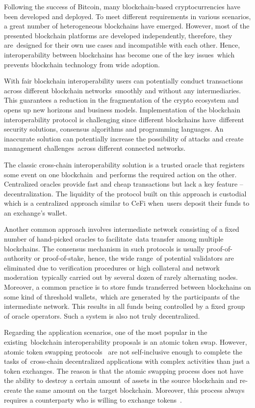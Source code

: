 Following the success of Bitcoin, many blockchain-based cryptocurrencies have been developed and deployed.
To meet different requirements in various scenarios, a great number of heterogeneous blockchains have emerged.
However, most of the presented blockchain platforms are developed independently, therefore, they are\
designed for their own use cases and incompatible with each other.
Hence, interoperability between blockchains has become one of the key issues\
which prevents blockchain technology from wide adoption.

With fair blockchain interoperability users can potentially conduct transactions across different blockchain networks\
smoothly and without any intermediaries.
This guarantees a reduction in the fragmentation of the crypto ecosystem and opens up new horizons and business models.
Implementation of the blockchain interoperability protocol is challenging since different blockchains have\
different security solutions, consensus algorithms and programming languages.
An inaccurate solution can potentially increase the possibility of attacks and create management challenges\
across different connected networks.

The classic cross-chain interoperability solution is a trusted oracle that registers some event on one blockchain\
and performs the required action on the other.
Centralized oracles provide fast and cheap transactions but lack a key feature -- decentralization.
The liquidity of the protocol built on this approach is custodial which is a centralized approach similar to CeFi when\
users deposit their funds to an exchange's wallet.

Another common approach involves intermediate network consisting of a fixed number of hand-picked oracles to facilitate\
data transfer among multiple blockchains.
The consensus mechanism in such protocols is usually proof-of-authority or proof-of-stake, hence, the wide range\
of potential validators are eliminated due to verification procedures or high collateral and network moderation\
typically carried out by several dozen of rarely alternating nodes.
Moreover, a common practice is to store funds transferred between blockchains on some kind of threshold wallets,\
which are generated by the participants of the intermediate network.
This results in all funds being controlled by a fixed group of oracle operators.
Such a system is also not truly decentralized.

Regarding the application scenarios, one of the most popular in the existing\
blockchain interoperability proposals is an atomic token swap.
However, atomic token swapping protocols~\cite{Miraz2019} are not self-inclusive enough to complete the tasks of\
cross-chain decentralized applications with complex activities than just a token exchanges.
The reason is that the atomic swapping process does not have the ability to destroy a certain amount\
of assets in the source blockchain and re-create the same amount on the target blockchain.
Moreover, this process always requires a counterparty who is willing to exchange tokens~\cite{Schulte2019TowardsBI}.

